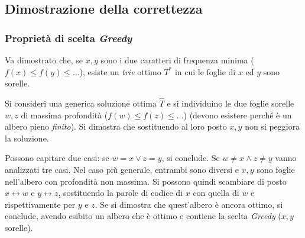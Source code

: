 \subsection{Dimostrazione della correttezza}

\subsubsection{Proprietà di scelta \emph{Greedy}}

Va dimostrato che, se $x,y$ sono i due caratteri di frequenza minima ($f(x) \leq f(y) \leq \dots$), esiste un \emph{trie} ottimo $T^*$ in cui le foglie di $x$ ed $y$ sono sorelle.

Si consideri una generica soluzione ottima $\widehat{T}$ e si individuino le due foglie sorelle $w,z$ di massima profondità ($f(w) \leq f(z) \leq \dots$) (devono esistere perché è un albero pieno \emph{finito}). Si dimostra che sostituendo al loro posto $x,y$ non si peggiora la soluzione.

Possono capitare due casi: se $w=x \vee z=y$, si conclude. Se $w \neq x \wedge z \neq y$ vanno analizzati tre casi. Nel caso più generale, entrambi sono diversi e $x,y$ sono foglie nell'albero con profondità non massima. Si possono quindi scambiare di posto $x \leftrightarrow w$ e $y \leftrightarrow z$, sostituendo la parole di codice di $x$ con quella di $w$ e rispettivamente per $y$ e $z$. Se si dimostra che quest'albero è ancora ottimo, si conclude, avendo esibito un albero che è ottimo e contiene la scelta \emph{Greedy} ($x,y$ sorelle).

